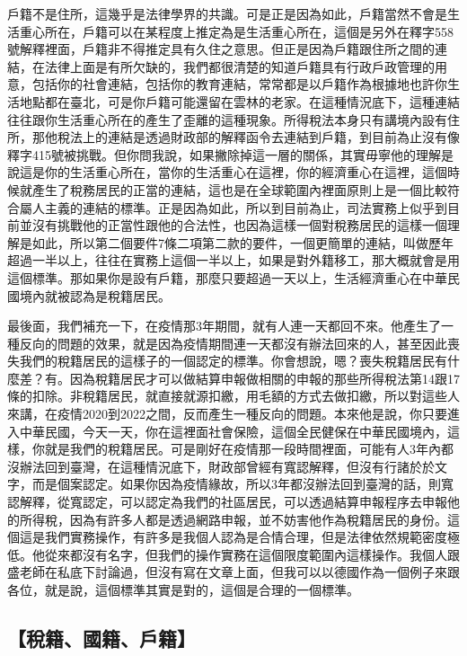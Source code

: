 \documentclass[oneside,sub3section]{ctexbook}
\begin{document}
戶籍不是住所，這幾乎是法律學界的共識。可是正是因為如此，戶籍當然不會是生活重心所在，戶籍可以在某程度上推定為是生活重心所在，這個是另外在釋字558號解釋裡面，戶籍非不得推定具有久住之意思。但正是因為戶籍跟住所之間的連結，在法律上面是有所欠缺的，我們都很清楚的知道戶籍具有行政戶政管理的用意，包括你的社會連結，包括你的教育連結，常常都是以戶籍作為根據地也許你生活地點都在臺北，可是你戶籍可能還留在雲林的老家。在這種情況底下，這種連結往往跟你生活重心所在的產生了歪離的這種現象。所得稅法本身只有講境內設有住所，那他稅法上的連結是透過財政部的解釋函令去連結到戶籍，到目前為止沒有像釋字415號被挑戰。但你問我說，如果撇除掉這一層的關係，其實毋寧他的理解是說這是你的生活重心所在，當你的生活重心在這裡，你的經濟重心在這裡，這個時候就產生了稅務居民的正當的連結，這也是在全球範圍內裡面原則上是一個比較符合屬人主義的連結的標準。正是因為如此，所以到目前為止，司法實務上似乎到目前並沒有挑戰他的正當性跟他的合法性，也因為這樣一個對稅務居民的這樣一個理解是如此，所以第二個要件7條二項第二款的要件，一個更簡單的連結，叫做歷年超過一半以上，往往在實務上這個一半以上，如果是對外籍移工，那大概就會是用這個標準。那如果你是設有戶籍，那麼只要超過一天以上，生活經濟重心在中華民國境內就被認為是稅籍居民。

最後面，我們補充一下，在疫情那3年期間，就有人連一天都回不來。他產生了一種反向的問題的效果，就是因為疫情期間連一天都沒有辦法回來的人，甚至因此喪失我們的稅籍居民的這樣子的一個認定的標準。你會想說，嗯？喪失稅籍居民有什麼差？有。因為稅籍居民才可以做結算申報做相關的申報的那些所得稅法第14跟17條的扣除。非稅籍居民，就直接就源扣繳，用毛額的方式去做扣繳，所以對這些人來講，在疫情2020到2022之間，反而產生一種反向的問題。本來他是說，你只要進入中華民國，今天一天，你在這裡面社會保險，這個全民健保在中華民國境內，這樣，你就是我們的稅籍居民。可是剛好在疫情那一段時間裡面，可能有人3年內都沒辦法回到臺灣，在這種情況底下，財政部曾經有寬認解釋，但沒有行諸於於文字，而是個案認定。如果你因為疫情緣故，所以3年都沒辦法回到臺灣的話，則寬認解釋，從寬認定，可以認定為我們的社區居民，可以透過結算申報程序去申報他的所得稅，因為有許多人都是透過網路申報，並不妨害他作為稅籍居民的身份。這個這是我們實務操作，有許多是我個人認為是合情合理，但是法律依然規範密度極低。他從來都沒有名字，但我們的操作實務在這個限度範圍內這樣操作。我個人跟盛老師在私底下討論過，但沒有寫在文章上面，但我可以以德國作為一個例子來跟各位，就是說，這個標準其實是對的，這個是合理的一個標準。

\hypertarget{ux7a05ux7c4dux570bux7c4dux6236ux7c4d}{%
\subsection{【稅籍、國籍、戶籍】}\label{ux7a05ux7c4dux570bux7c4dux6236ux7c4d}}
\end{document}
